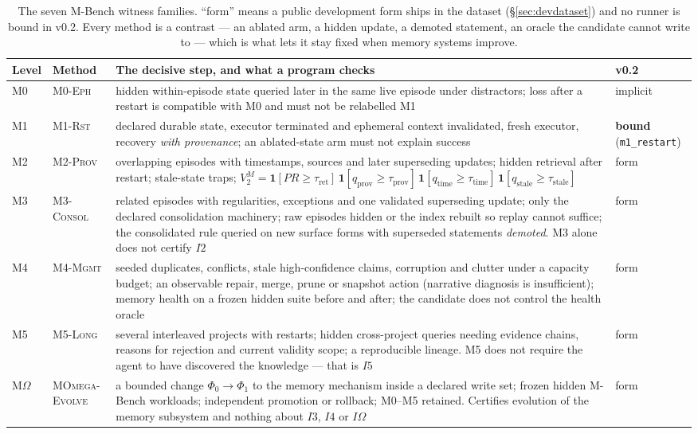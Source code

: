 \begin{table}[!htbp]
\centering\scriptsize
\begin{tabularx}{\textwidth}{@{}llYl@{}}
\toprule
Level & Method & The decisive step, and what a program checks & v0.2 \\
\midrule
M0 & \textsc{M0-Eph} & hidden within-episode state queried later in the same live episode under distractors; loss after a restart is compatible with M0 and must not be relabelled M1 & implicit \\
M1 & \textsc{M1-Rst} & declared durable state, executor terminated and ephemeral context invalidated, fresh executor, recovery \emph{with provenance}; an ablated-state arm must not explain success & \textbf{bound} (\texttt{m1\_restart}) \\
M2 & \textsc{M2-Prov} & overlapping episodes with timestamps, sources and later superseding updates; hidden retrieval after restart; stale-state traps; $V^{M}_2 = \mathbf 1[PR \ge \tau_{\mathrm{ret}}]\,\mathbf 1[q_{\mathrm{prov}} \ge \tau_{\mathrm{prov}}]\,\mathbf 1[q_{\mathrm{time}} \ge \tau_{\mathrm{time}}]\,\mathbf 1[q_{\mathrm{stale}} \ge \tau_{\mathrm{stale}}]$ & form \\
M3 & \textsc{M3-Consol} & related episodes with regularities, exceptions and one validated superseding update; only the declared consolidation machinery; raw episodes hidden or the index rebuilt so replay cannot suffice; the consolidated rule queried on new surface forms with superseded statements \emph{demoted}. M3 alone does not certify $I2$ & form \\
M4 & \textsc{M4-Mgmt} & seeded duplicates, conflicts, stale high-confidence claims, corruption and clutter under a capacity budget; an observable repair, merge, prune or snapshot action (narrative diagnosis is insufficient); memory health on a frozen hidden suite before and after; the candidate does not control the health oracle & form \\
M5 & \textsc{M5-Long} & several interleaved projects with restarts; hidden cross-project queries needing evidence chains, reasons for rejection and current validity scope; a reproducible lineage. M5 does not require the agent to have discovered the knowledge --- that is $I5$ & form \\
M$\Omega$ & \textsc{MOmega-Evolve} & a bounded change $\Phi_0 \to \Phi_1$ to the memory mechanism inside a declared write set; frozen hidden M-Bench workloads; independent promotion or rollback; M0--M5 retained. Certifies evolution of the memory subsystem and nothing about $I3$, $I4$ or $I\Omega$ & form \\
\bottomrule
\end{tabularx}
\caption{The seven M-Bench witness families. ``form'' means a public development form ships in the dataset (\S\ref{sec:devdataset}) and no runner is bound in v0.2. Every method is a contrast --- an ablated arm, a hidden update, a demoted statement, an oracle the candidate cannot write to --- which is what lets it stay fixed when memory systems improve.}
\label{tab:mbench}
\end{table}

